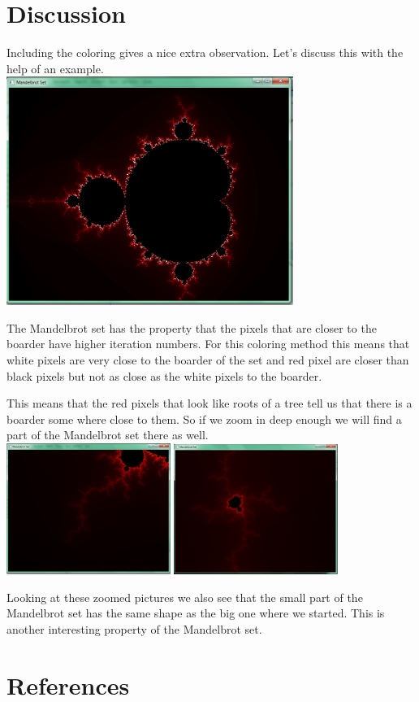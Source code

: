 \documentclass[final, paper=a4, paper=portrait, pagesize=auto, fontsize=10pt,english]{scrartcl}
\begin{document}
\section{Discussion}
Including the coloring gives a nice extra observation. Let's discuss this with the help of an example. \\
\includegraphics[width=0.7\textwidth]{screenie5}

The Mandelbrot set has the property that the pixels that are closer to the boarder have higher iteration numbers. For this coloring method this means that white pixels are very close to the boarder of the set and red pixel are closer than black pixels but not as close as the white pixels to the boarder. 

This means that the red pixels that look like roots of a tree tell us that there is a boarder some where close to them. So if we zoom in deep enough we will find a part of the Mandelbrot set there as well. \\

\includegraphics[width=0.4\textwidth]{screenie6}
\includegraphics[width=0.4\textwidth]{screenie7}

Looking at these zoomed pictures we also see that the small part of the Mandelbrot set has the same shape as the big one where we started. This is another interesting property of the Mandelbrot set.

\section{References}
\end{document}
